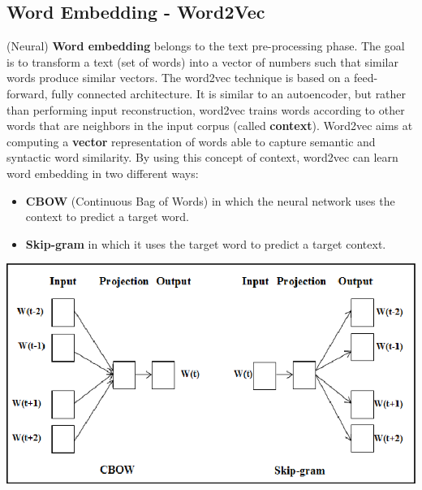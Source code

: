 \subsection{Word Embedding - Word2Vec}
(Neural) \textbf{Word embedding} belongs to the text pre-processing phase. The goal is to transform a text (set of words) into a vector of numbers such that similar words produce similar vectors. The word2vec technique is based on a feed-forward, fully connected architecture. It is similar to an autoencoder, but rather than performing input reconstruction, word2vec trains words according to other words that are neighbors in the input corpus (called \textbf{context}).\newline\newline
Word2vec aims at computing a \textbf{vector} representation of words able to capture semantic and syntactic word similarity.\newline\newline
By using this concept of context, word2vec can learn word embedding in two different ways:
\begin{itemize}
    \item \textbf{CBOW} (Continuous Bag of Words) in which the neural network uses the context to predict a target word.

    \item \textbf{Skip-gram} in which it uses the target word to predict a target context.
\end{itemize}
\begin{center}
    \includegraphics[scale = 0.3]{images/word2vec.png}
\end{center}

